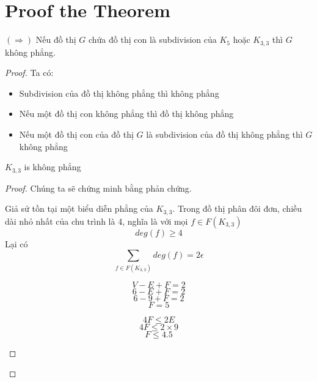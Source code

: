 \section{Proof the Theorem}
$(\Rightarrow)$  Nếu đồ thị $G$ chứa đồ thị con là subdivision của $K_5$ hoặc $K_{3,3}$ thì $G$ không phẳng. \\

\begin{proof}
    Ta có:
    \begin{itemize}
        \item Subdivision của đồ thị không phẳng thì không phẳng

        \item Nếu một đồ thị con không phẳng thì đồ thị không phẳng

        \item Nếu một đồ thị con của đồ thị $G$ là subdivision của đồ thị không phẳng thì $G$ không phẳng
    \end{itemize}
    \begin{lemma}
        $K_{3,3}$ is không phẳng
    \end{lemma}

    \begin{proof}
        Chúng ta sẽ chứng minh bằng phản chứng.

        Giả sử tồn tại một biểu diễn phẳng của $K_{3,3}$. Trong đồ thị phân đôi đơn, chiều dài nhỏ nhất của chu trình là 4, nghĩa là với mọi $f \in F(K_{3,3})$
        $$deg(f) \geq 4$$
        Lại có $$\sum_{f \in F(K_{3,3})}deg(f) = 2\epsilon$$
        \begin{figure}[H]
            \begin{minipage}{0.3\textwidth}
                $$V-E+F=2$$
                $$6-E+F=2$$
                $$6-9+F=2$$
                $$F=5$$
            \end{minipage}
            \hfill
            \begin{minipage}{0.35\textwidth}
                \centering
            \end{minipage}
            \hfill
            \begin{minipage}{0.3\textwidth}
                \centering
                $$4F \leq 2E$$
                $$4F \leq 2 \times 9$$
                $$ F \leq 4.5$$
            \end{minipage}
        \end{figure}
    \end{proof}


\end{proof}
